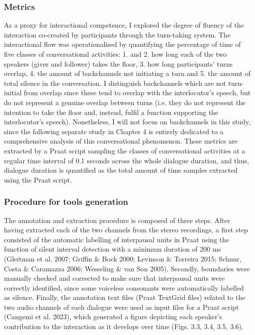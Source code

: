 \subsubsection{Metrics}
\hypertarget{Toc191305932}{}\begin{styleStandard}
As a proxy for interactional competence, I explored the degree of fluency of the interaction co-created by participants through the turn-taking system. The interactional flow was operationalised by quantifying the percentage of time of five classes of conversational activities: 1. and 2. how long each of the two speakers (giver and follower) takes the floor, 3. how long participants’ turns overlap, 4. the amount of backchannels not initiating a turn and 5. the amount of total silence in the conversation. I distinguish backchannels which are not turn-initial from overlap since these tend to overlap with the interlocutor’s speech, but do not represent a genuine overlap between turns (i.e. they do not represent the intention to take the floor and, instead, fulfil a function supporting the interlocutor’s speech). Nonetheless, I will not focus on backchannels in this study, since the following separate study in Chapter 4 is entirely dedicated to a comprehensive analysis of this conversational phenomenon. These metrics are extracted by a Praat script sampling the classes of conversational activities at a regular time interval of 0.1 seconds across the whole dialogue duration, and thus, dialogue duration is quantified as the total amount of time samples extracted using the Praat script.
\end{styleStandard}

\subsubsection{Procedure for tools generation}
\hypertarget{Toc191305933}{}\begin{styleStandard}
The annotation and extraction procedure is composed of three steps. After having extracted each of the two channels from the stereo recordings, a first step consisted of the automatic labelling of interpausal units in Praat using the function of silent interval detection with a minimum duration of 200 ms (Gleitman et al. 2007; Griffin \& Bock 2000; Levinson \& Torreira 2015; Schnur, Costa \& Caramazza 2006; Wesseling \& van Son 2005). Secondly, boundaries were manually checked and corrected to make sure that interpausal units were correctly identified, since some voiceless consonants were automatically labelled as silence. Finally, the annotation text files (Praat TextGrid files) related to the two audio channels of each dialogue were used as input files for a Praat script (Cangemi et al. 2023), which generated a figure depicting each speaker’s contribution to the interaction as it develops over time (Figs. 3.3, 3.4, 3.5, 3.6).
\end{styleStandard}

